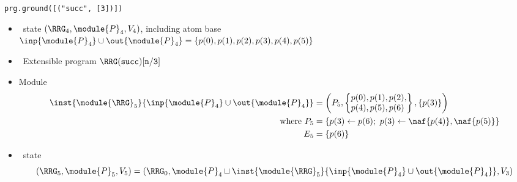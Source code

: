 \begin{frame}{\texttt{prg.ground([("succ", [3])])}}
  \begin{itemize}
  \item {} \clingo\ state $(\boldsymbol{\RRG}_4,\module{P}_4,V_4 )$, including atom base
    \\\qquad\quad
    \(
    {\inp{\module{P}_4}\cup\out{\module{P}_4}}=\{p(0),p(1),p(2),p(3),p(4),p(5)\}
    \)
  \item {} \ Extensible program
    \(
    \RRG(\mathtt{succ})[\mathtt{n}/\mathtt{3}]
    \)
  \item<2->  Module
    \begin{align*}
      \inst{\module{\RRG}_5}{\inp{\module{P}_4}\cup\out{\module{P}_4}}
      &{}=
        \left(
        P_5%
        ,
        \left\{
        \begin{array}{@{}l@{}}
          p(0),p(1),p(2),
          \\
          p(4),p(5),p(6)
        \end{array}
      \right\}
      ,
      \left\{
      p(3)
      \right\}
      \right)
      \\ \text{where }
      P_5 & {} = \{p(3)\leftarrow p(6);\ p(3)\leftarrow \naf{p(4)},\naf{p(5)}\}\\
      E_5 & {} = \{p(6)\}
    \end{align*}
  \item<3->  \clingo\ state
    \[
    (\boldsymbol{\RRG}_5,\module{P}_5,V_5 )
    =
    (\boldsymbol{\RRG}_0,\module{P}_4\sqcup\inst{\module{\RRG}_5}{\inp{\module{P}_4}\cup\out{\module{P}_4}},V_3)
    \]
  \end{itemize}
\end{frame}
